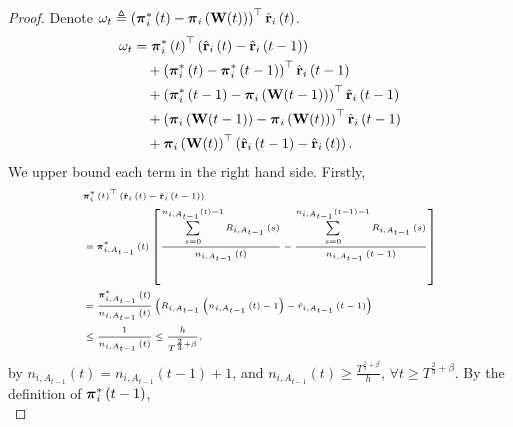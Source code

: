 \begin{proof}
    Denote $\omega_t \triangleq \left( {{\boldsymbol{\pi}}_i^*\left(t\right)} - {\boldsymbol{\pi}}_i\left( {\mathbf{W}}(t) \right) \right)^\top \hat{{\mathbf{r}}}_i\left(t\right)$.
\begin{equation}
\label{eq:dynamic_regret_decomposition}
\begin{split}
    \omega_t &= {{\boldsymbol{\pi}}_i^*\left(t\right)}^\top \left( \hat{{\mathbf{r}}}_i\left(t\right) - \hat{{\mathbf{r}}}_i\left(t-1\right)\right) \\
    &\quad + \left( {{\boldsymbol{\pi}}_i^*\left(t\right)} - {{\boldsymbol{\pi}}_i^*\left(t-1\right)} \right)^\top \hat{{\mathbf{r}}}_i\left(t-1\right) \\
    &\quad + \left( {{\boldsymbol{\pi}}_i^*\left(t-1\right)} - {\boldsymbol{\pi}}_i\left( {\mathbf{W}}(t-1) \right) \right)^\top \hat{{\mathbf{r}}}_i\left(t-1\right) \\
    &\quad + \left(  {\boldsymbol{\pi}}_i\left( {\mathbf{W}}(t-1) \right) - {\boldsymbol{\pi}}_i\left( {\mathbf{W}}(t) \right) 
    \right)^\top \hat{{\mathbf{r}}}_i\left(t-1\right) \\
    &\quad + {\boldsymbol{\pi}}_i\left( {\mathbf{W}}(t) \right)^\top \left( \hat{{\mathbf{r}}}_i\left(t-1\right) - \hat{{\mathbf{r}}}_i\left(t\right)  \right).
\end{split}
\end{equation}
We upper bound each term in the right hand side. Firstly,
\begin{equation*}
\tiny
\begin{split}
    &{\rvpi_i^*\left(t\right)}^\top \left( \hat{\rvr}_i\left(t\right) - \hat{\rvr}_i\left(t-1\right)\right) \\
    &= {\rvpi_{i, A_{t-1}}^*\left(t\right)} \left[ \frac{\sum\limits_{s=0}^{n_{i, A_{t-1}}\left(t\right)-1}{R_{i, A_{t-1}}\left(s\right)}}{n_{i, A_{t-1}}\left(t\right)} - \frac{\sum\limits_{s=0}^{n_{i, A_{t-1}}\left(t-1\right)-1}{R_{i, A_{t-1}}\left(s\right)}}{n_{i, A_{t-1}}\left(t-1\right)} \right] \\
    &= \frac{{\rvpi_{i, A_{t-1}}^*\left(t\right)}}{n_{i, A_{t-1}}\left(t\right)} \left( R_{i, A_{t-1}}\left( n_{i, A_{t-1}}\left(t\right) -1 \right) - \hat{r}_{i, A_{t-1}}\left(t-1\right) \right) \\
    &\le \frac{1}{n_{i, A_{t-1}}\left(t\right)} \le \frac{h}{T^{\frac{2}{3} + \beta}},
\end{split}
\end{equation*}
by $n_{i, A_{t-1}}\left(t\right) = n_{i, A_{t-1}}\left(t-1\right) + 1$, and $n_{i, A_{t-1}}\left(t\right) \ge \frac{T^{\frac{2}{3} + \beta}}{h}$, $\forall t \ge T^{\frac{2}{3} + \beta}$. By the definition of ${{\boldsymbol{\pi}}_i^*\left(t-1\right)}$,
\begin{equation*}

\end{equation*}
\end{proof}
